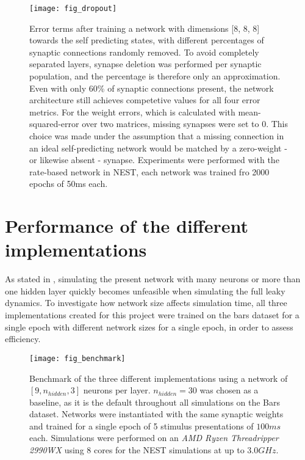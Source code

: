 \begin{figure}[t]
    \centering
    \texttt{[image: fig\_dropout]}
    \caption{Error terms after training a network with dimensions [8, 8, 8] towards the self predicting states, with
    different percentages of synaptic connections randomly removed. To avoid completely separated layers, synapse
    deletion was performed per synaptic population, and the percentage is therefore only an approximation. Even with
    only 60\% of synaptic connections present, the network architecture still achieves competetive values for all four
    error metrics. For the weight errors, which is calculated with mean-squared-error over two matrices, missing
    synapses were set to $0$. This choice was made under the assumption that a missing connection in an ideal
    self-predicting network would be matched by a zero-weight - or likewise absent - synapse. Experiments were performed
    with the rate-based network in NEST, each network was trained fro 2000 epochs of 50ms each.}
    \label{fig-dropout}
\end{figure}



\section{Performance of the different implementations}

As stated in \cite{Haider2021}, simulating the present network with many neurons or more than one hidden layer quickly
becomes unfeasible when simulating the full leaky dynamics. To investigate how network size affects simulation time, all
three implementations created for this project were trained on the bars dataset for a single epoch with different
network sizes for a single epoch, in order to assess efficiency.


\begin{figure}[t]
    \centering
    \texttt{[image: fig\_benchmark]}
    \caption{Benchmark of the three different implementations using a network of $[9, n_{hidden}, 3]$ neurons per layer.
        $n_{hidden}=30$ was chosen as a baseline, as it is the default throughout all simulations on the Bars dataset.
        Networks were instantiated with the same synaptic weights and trained for a single epoch of 5 stimulus
        presentations of $100ms$ each. Simulations were performed on an \textit{AMD Ryzen Threadripper 2990WX} using 8
        cores for the NEST simulations at up to $3.0GHz$.}
    \label{fig-benchmark}
\end{figure}

